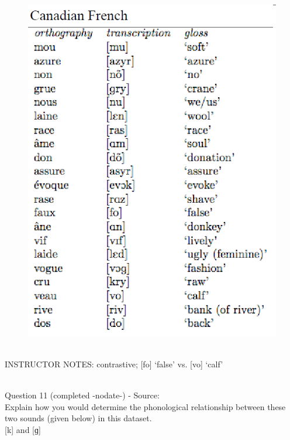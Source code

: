 \documentclass[12pt]{article}
\begin{document}
\begin{figure}[H]
\includegraphics{../images/canadianfrench.png}
\end{figure}

~\\
INSTRUCTOR NOTES: contrastive; [fo] ‘false’ vs. [vo] ‘calf’


~\\

{\large Question 11} (completed -nodate-) - Source: \\

Explain how you would determine the phonological relationship between these two sounds (given below) in this dataset.\\

{[k]} and {[ɡ]}
\end{document}
